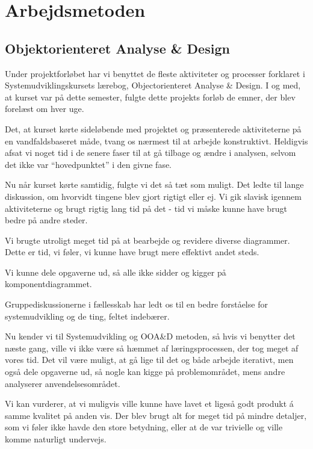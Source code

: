 \chapter{Arbejdsmetoden}
\label{arbejdsmetoden}

\section{Objektorienteret Analyse \& Design}

Under projektforløbet har vi benyttet de fleste aktiviteter og processer forklaret i Systemudviklingskursets lærebog, Objectorienteret Analyse \& Design\cite{ooad}. I og med, at kurset var på dette semester, fulgte dette projekts forløb de emner, der blev forelæst om hver uge. 

Det, at kurset kørte sideløbende med projektet og præsenterede aktiviteterne på en vandfaldsbaseret måde, tvang os nærmest til at arbejde konstruktivt. Heldigvis afsat vi noget tid i de senere faser til at gå tilbage og ændre i \fx analysen, selvom det ikke var ``hovedpunktet'' i den givne fase.

Nu når kurset kørte samtidig, fulgte vi det så tæt som muligt. Det ledte til lange diskussion, om hvorvidt tingene blev gjort rigtigt eller ej. Vi gik slavisk igennem aktiviteterne og brugt rigtig lang tid på det - tid vi måske kunne have brugt bedre på andre steder.

Vi brugte utroligt meget tid på at bearbejde og revidere diverse diagrammer. Dette er tid, vi føler, vi kunne have brugt mere effektivt andet steds.

Vi kunne dele opgaverne ud, så alle ikke sidder og kigger på \fx komponentdiagrammet.

Gruppediskussionerne i fællesskab har ledt os til en bedre forståelse for systemudvikling og de ting, feltet indebærer. 

Nu kender vi til Systemudvikling og OOA\&D metoden, så hvis vi benytter det næste gang, ville vi ikke være så hæmmet af læringsprocessen, der tog meget af vores tid. Det vil være muligt, at gå lige til det og både arbejde iterativt, men også dele opgaverne ud, så \fx nogle kan kigge på problemområdet, mens andre analyserer anvendelsesområdet.

Vi kan vurderer, at vi muligvis ville kunne have lavet et ligeså godt produkt á samme kvalitet på anden vis. Der blev brugt alt for meget tid på mindre detaljer, som vi føler ikke havde den store betydning, eller at de var trivielle og ville komme naturligt undervejs.

